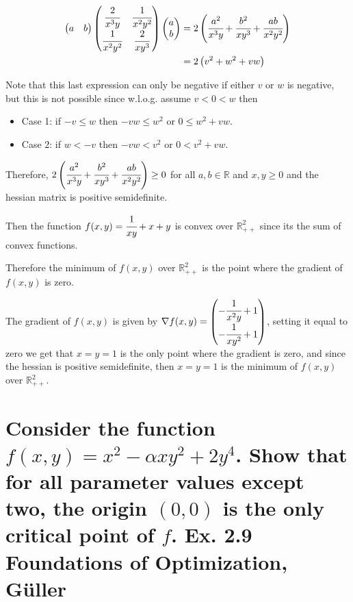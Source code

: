 \documentclass[10pt]{article}
\begin{document}
\begin{align*}
    \begin{pmatrix}
        a & b \\
    \end{pmatrix} \begin{pmatrix}
        \cfrac{2}{x^3y} & \cfrac{1}{x^2y^2} \\
        \cfrac{1}{x^2y^2} & \cfrac{2}{xy^3} 
        \end{pmatrix}
        \begin{pmatrix}
        a \\
        b
    \end{pmatrix} &= 2 \left( \cfrac{a^2}{x^3y} + \cfrac{b^2}{xy^3} + \cfrac{ab}{x^2 y^2} \right)\\
    &= 2 \left( v^2 + w^2 + vw \right)\\
\end{align*}

Note that this last expression can only be negative if either $v$ or $w$ is negative, but this is not possible since 
w.l.o.g. assume $v<0<w$ then 
\begin{itemize}
    \item Case 1: if $-v \leq w$ then $-vw \leq w^2$ or $0 \leq w^2 + vw$.
    \item Case 2: if $w<-v$ then $-vw < v^2$ or $0 < v^2 + vw$.
\end{itemize}

Therefore, $2 \left( \cfrac{a^2}{x^3y} + \cfrac{b^2}{xy^3} + \cfrac{ab}{x^2 y^2} \right) \geq 0$ for all $a,b \in \mathbb{R}$ and $x,y \geq 0$ 
and the hessian matrix is positive semidefinite. 

Then the function $f(x,y) = \cfrac{1}{xy} + x + y$ is convex over $\mathbb{R}_{++}^2$ since its the sum of convex functions.

Therefore the minimum of $f(x,y)$ over $\mathbb{R}_{++}^2$ is the point where the gradient of $f(x,y)$ is zero. 

The gradient of $f(x,y)$ is given by $\nabla f(x,y) = \begin{pmatrix}
-\cfrac{1}{x^2 y} + 1 \\
-\cfrac{1}{xy^2} + 1
\end{pmatrix}$, setting it equal to zero we get that $x=y=1$ is the only point where the gradient is zero, and since the hessian is positive semidefinite, then $x=y=1$ is the minimum of $f(x,y)$ over $\mathbb{R}_{++}^2$.


\hfill \break %

\section{Consider the function $f(x,y) = x^2 - \alpha xy^2 + 2 y^4$. Show that for all 
parameter values except two, the origin $(0,0)$ is the only critical point of $f$. Ex. 2.9 Foundations of Optimization, Güller}
\end{document}
